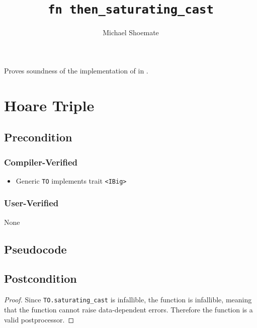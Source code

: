 \documentclass{article}
\title{\texttt{fn then\_saturating\_cast}}
\author{Michael Shoemate}
\date{}
\begin{document}
\maketitle

\contrib
Proves soundness of the implementation of  in .

\section{Hoare Triple}
\subsection*{Precondition}
\subsubsection*{Compiler-Verified}

\begin{itemize}
    \item Generic \texttt{TO} implements trait \texttt{<IBig>}
\end{itemize}

\subsubsection*{User-Verified}
None

\subsection*{Pseudocode}


\subsection*{Postcondition}
\begin{theorem}
\end{theorem}

\begin{proof}
    Since \texttt{TO.saturating\_cast} is infallible, the function is infallible,
    meaning that the function cannot raise data-dependent errors.
    Therefore the function is a valid postprocessor.
\end{proof}
\end{document}
